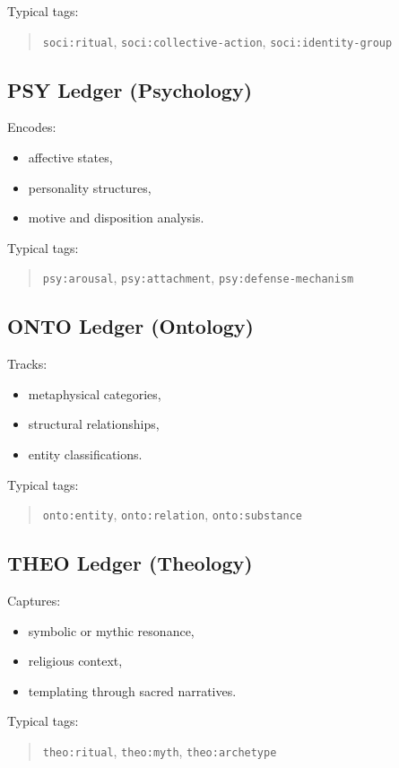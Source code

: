 Typical tags:
\begin{quote}
\texttt{soci:ritual}, \texttt{soci:collective-action}, \texttt{soci:identity-group}
\end{quote}

\subsection{PSY Ledger (Psychology)}
Encodes:
\begin{itemize}
    \item affective states,
    \item personality structures,
    \item motive and disposition analysis.
\end{itemize}

Typical tags:
\begin{quote}
\texttt{psy:arousal}, \texttt{psy:attachment}, \texttt{psy:defense-mechanism}
\end{quote}

\subsection{ONTO Ledger (Ontology)}
Tracks:
\begin{itemize}
    \item metaphysical categories,
    \item structural relationships,
    \item entity classifications.
\end{itemize}

Typical tags:
\begin{quote}
\texttt{onto:entity}, \texttt{onto:relation}, \texttt{onto:substance}
\end{quote}

\subsection{THEO Ledger (Theology)}
Captures:
\begin{itemize}
    \item symbolic or mythic resonance,
    \item religious context,
    \item templating through sacred narratives.
\end{itemize}

Typical tags:
\begin{quote}
\texttt{theo:ritual}, \texttt{theo:myth}, \texttt{theo:archetype}
\end{quote}

